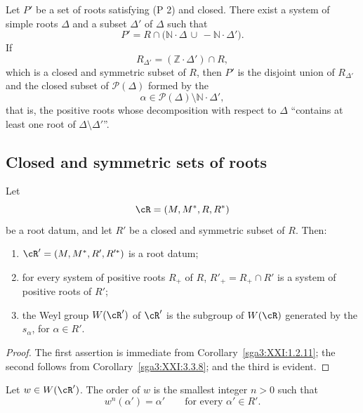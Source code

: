 \begin{scholium}\label{sga3:XXI:3.3.11}
Let \(P'\) be a set of roots satisfying (P 2) and closed. There exist a
system of simple roots \(\Delta\) and a subset \(\Delta'\) of
\(\Delta\) such that
\[
 P'=R\cap\bigl(\mathbb{N}\cdot\Delta
          \,\cup\, -\mathbb{N}\cdot\Delta'\bigr).
\]
If
\[
 R_{\Delta'}=(\mathbb{Z}\cdot\Delta')\cap R,
\]
which is a closed and symmetric subset of \(R\), then \(P'\) is the
disjoint union of \(R_{\Delta'}\) and the closed subset of
\(\mathscr{P}(\Delta)\) formed by the
\[
 \alpha\in\mathscr{P}(\Delta)\setminus
           \mathbb{N}\cdot\Delta',
\]
that is, the positive roots whose decomposition with respect to
\(\Delta\) ``contains at least one root of
\(\Delta\setminus\Delta'\)''.
\end{scholium}

\subsection{Closed and symmetric sets of roots}
\label{sga3:XXI:3.4}

\begin{proposition}\label{sga3:XXI:3.4.1}
Let
\[
 \cR=(M,M^\ast,R,R^\ast)
\]
be a root datum, and let \(R'\) be a closed and symmetric subset of
\(R\). Then:
\begin{enumerate}
\item[(i)] \(\cR'=(M,M^\ast,R',R'^\ast)\) is a root datum;
\item[(ii)] for every system of positive roots \(R_+\) of \(R\),
  \(R'_+=R_+\cap R'\) is a system of positive roots of \(R'\);
\item[(iii)] the Weyl group \(W(\cR')\) of \(\cR'\) is the subgroup
  of \(W(\cR)\) generated by the \(s_\alpha\), for
  \(\alpha\in R'\).
\end{enumerate}
\end{proposition}

\begin{proof}
The first assertion is immediate from
Corollary~\ref{sga3:XXI:1.2.11}; the second follows from
Corollary~\ref{sga3:XXI:3.3.8}; and the third is evident.
\end{proof}

\begin{corollary}\label{sga3:XXI:3.4.2}
Let \(w\in W(\cR')\). The order of \(w\) is the smallest integer
\(n>0\) such that
\[
 w^n(\alpha')=\alpha'
 \qquad\text{for every }\alpha'\in R'.
\]
\end{corollary}

